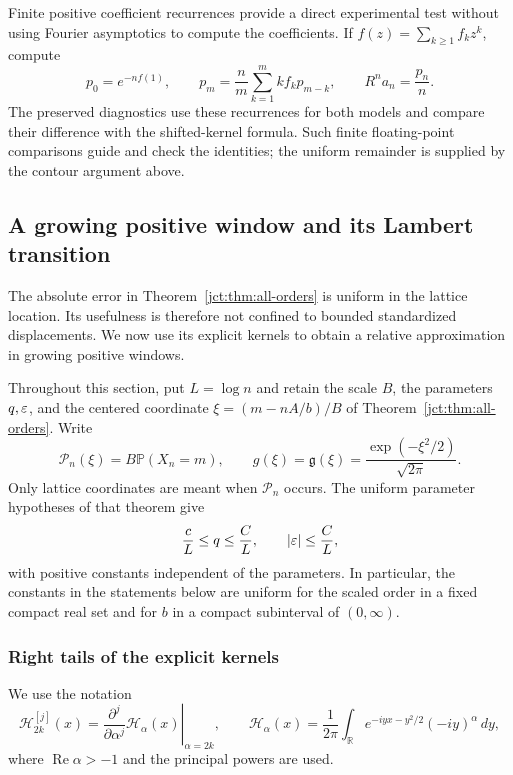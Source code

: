 Finite positive coefficient recurrences provide a direct experimental
test without using Fourier asymptotics to compute the coefficients.
If $f(z)=\sum_{k\ge1}f_kz^k$, compute
\[
 p_0=e^{-nf(1)},\qquad
 p_m=\frac n m\sum_{k=1}^m k f_k p_{m-k},
 \qquad R^n a_n=\frac{p_n}{n}.
\]
The preserved diagnostics use these recurrences for both models and
compare their difference with the shifted-kernel formula. Such finite
floating-point comparisons guide and check the identities; the
uniform remainder is supplied by the contour argument above.


\subsection{A growing positive window and its Lambert transition}
\label{jct:sec:positive-wing}

The absolute error in Theorem~\ref{jct:thm:all-orders} is uniform in the
lattice location.  Its usefulness is therefore not confined to bounded
standardized displacements.  We now use its explicit kernels to obtain
a relative approximation in growing positive windows.

Throughout this section, put $L=\log n$ and retain the scale $B$, the
parameters $q,\varepsilon$, and the centered coordinate
$\xi=(m-nA/b)/B$ of Theorem~\ref{jct:thm:all-orders}.  Write
\[
 \mathcal P_n(\xi)=B\mathbb P(X_n=m),\qquad
 g(\xi)=\mathfrak{g}(\xi)=\frac{\exp(-\xi^2/2)}{\sqrt{2\pi}}.
\]
Only lattice coordinates are meant when $\mathcal P_n$ occurs.  The
uniform parameter hypotheses of that theorem give
\begin{equation}\label{jct:wing:small-parameters}
 \frac{c}{L}\le q\le\frac{C}{L},\qquad
 |\varepsilon|\le\frac{C}{L},
\end{equation}
with positive constants independent of the parameters.  In particular,
the constants in the statements below are uniform for the scaled order
in a fixed compact real set and for $b$ in a compact subinterval of
$(0,\infty)$.

\subsubsection{Right tails of the explicit kernels}

We use the notation
\[
 \mathcal H_{2k}^{[j]}(x)
 =\left.\frac{\partial^j}{\partial\alpha^j}
             \mathcal H_\alpha(x)\right|_{\alpha=2k},\qquad
 \mathcal H_\alpha(x)=\frac1{2\pi}
       \int_{\mathbb R}e^{-iyx-y^2/2}(-iy)^\alpha\,dy,
\]
where $\operatorname{Re}\alpha>-1$ and the principal powers are used.

